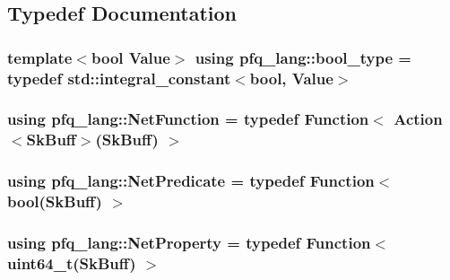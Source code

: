 \subsection{Typedef Documentation}
\hypertarget{namespacepfq__lang_a66ac99ea626e7d1994f42ebfa003fbff}{
\subsubsection[{bool\+\_\+type}]{\setlength{\rightskip}{0pt plus 5cm}template$<$bool Value$>$ using {\bf pfq\+\_\+lang\+::bool\+\_\+type} = typedef std\+::integral\+\_\+constant$<$bool, Value$>$}}\label{namespacepfq__lang_a66ac99ea626e7d1994f42ebfa003fbff}
\hypertarget{namespacepfq__lang_a63dfceff54d39223bbfe7dbc9616c643}{
\subsubsection[{Net\+Function}]{\setlength{\rightskip}{0pt plus 5cm}using {\bf pfq\+\_\+lang\+::\+Net\+Function} = typedef {\bf Function}$<$ {\bf Action}$<${\bf Sk\+Buff}$>$({\bf Sk\+Buff}) $>$}}\label{namespacepfq__lang_a63dfceff54d39223bbfe7dbc9616c643}
\hypertarget{namespacepfq__lang_a7f62267862cd6049344078744cbcde3b}{
\subsubsection[{Net\+Predicate}]{\setlength{\rightskip}{0pt plus 5cm}using {\bf pfq\+\_\+lang\+::\+Net\+Predicate} = typedef {\bf Function}$<$ bool({\bf Sk\+Buff}) $>$}}\label{namespacepfq__lang_a7f62267862cd6049344078744cbcde3b}
\hypertarget{namespacepfq__lang_aedb71fd680cdb670390e8fac13a7cb5e}{
\subsubsection[{Net\+Property}]{\setlength{\rightskip}{0pt plus 5cm}using {\bf pfq\+\_\+lang\+::\+Net\+Property} = typedef {\bf Function}$<$ uint64\+\_\+t({\bf Sk\+Buff}) $>$}}\label{namespacepfq__lang_aedb71fd680cdb670390e8fac13a7cb5e}


